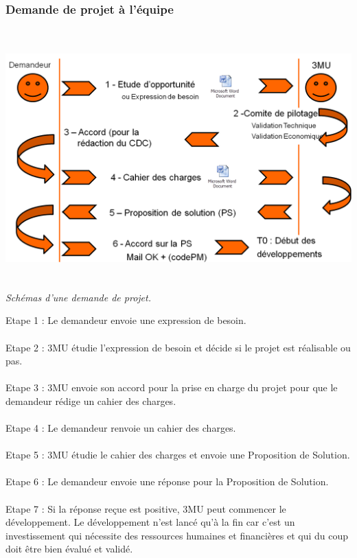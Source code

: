 \documentclass[a4paper,twoside,12pt,openright]{report}
\begin{document}
\subsubsection{Demande de projet à l'équipe}
\begin{center}
\includegraphics[height=10cm]{Demande_projet.PNG}\\
\itshape Schémas d'une demande de projet.
\end{center}
\vspace{1cm}
Etape 1 :	Le demandeur envoie une expression de besoin.\\\\
Etape 2 :	3MU  étudie l’expression de besoin et décide si  le projet est réalisable ou pas.\\\\
Etape 3 :	3MU envoie son accord pour la prise en charge du projet pour que le demandeur rédige un cahier des charges.\\\\
Etape 4 :	Le demandeur renvoie un cahier des charges.\\\\
Etape 5 :	3MU étudie le cahier des charges et envoie une Proposition de Solution.\\\\
Etape 6 :	Le demandeur envoie une réponse pour la Proposition de Solution.\\\\
Etape 7 :	Si la réponse reçue est positive, 3MU peut commencer le développement.
Le développement n’est lancé qu’à la fin car c’est un investissement qui nécessite des ressources humaines et financières et qui du coup doit être bien évalué et validé.
\newpage
\end{document}
